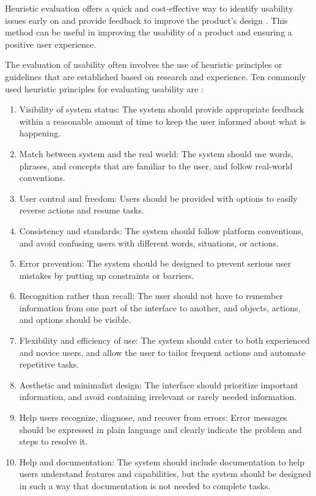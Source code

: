 \documentclass[conference,onecolumn]{IEEEtran}
\begin{document}
        Heuristic evaluation offers a quick and cost-effective way to identify usability issues early on and provide feedback to improve the product's design \cite{molich1990improving}. This method can be useful in improving the usability of a product and ensuring a positive user experience.
        
        The evaluation of usability often involves the use of heuristic principles or guidelines that are established based on research and experience. Ten commonly used heuristic principles for evaluating usability are \cite{nielsen2005ten}:

        \begin{enumerate}
            \item Visibility of system status: The system should provide appropriate feedback within a reasonable amount of time to keep the user informed about what is happening.
            \item Match between system and the real world: The system should use words, phrases, and concepts that are familiar to the user, and follow real-world conventions.
            \item User control and freedom: Users should be provided with options to easily reverse actions and resume tasks.
            \item Consistency and standards: The system should follow platform conventions, and avoid confusing users with different words, situations, or actions.
            \item Error prevention: The system should be designed to prevent serious user mistakes by putting up constraints or barriers.
            \item Recognition rather than recall: The user should not have to remember information from one part of the interface to another, and objects, actions, and options should be visible.
            \item Flexibility and efficiency of use: The system should cater to both experienced and novice users, and allow the user to tailor frequent actions and automate repetitive tasks.
            \item Aesthetic and minimalist design: The interface should prioritize important information, and avoid containing irrelevant or rarely needed information.
            \item Help users recognize, diagnose, and recover from errors: Error messages should be expressed in plain language and clearly indicate the problem and steps to resolve it.    
            \item Help and documentation: The system should include documentation to help users understand features and capabilities, but the system should be designed in such a way that documentation is not needed to complete tasks.
        \end{enumerate}
\end{document}
